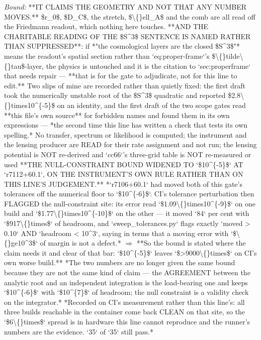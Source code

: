 \begin{description}
 \emph{Bound:}  **IT CLAIMS THE GEOMETRY AND NOT THAT ANY NUMBER MOVES.** \$r\_0\$, \$D\_C\$, the stretch, \$\textbackslash\{\}ell\_A\$ and the comb are all read off the Friedmann readout, which nothing here touches.  **AND THE CHARITABLE READING OF THE \$S\textasciicircum{}3\$ SENTENCE IS NAMED RATHER THAN SUPPRESSED**: if *"the cosmological layers are the closed \$S\textasciicircum{}3\$"* means the readout's spatial section rather than `eq:proper-frame`'s \$\textbackslash\{\}tilde\textbackslash\{\}tau\$-layer, the physics is untouched and it is the citation to `sec:properframe` that needs repair --- **that is for the gate to adjudicate, not for this line to edit.**  Two slips of mine are recorded rather than quietly fixed: the first draft took the numerically unstable root of the \$S\textasciicircum{}3\$ quadratic and reported \$2.8\textbackslash\{\}times10\textasciicircum{}\{-5\}\$ on an identity, and the first draft of the two scope gates read **this file's own source** for forbidden names and found them in its own expressions --- *the second time this line has written a check that tests its own spelling.*  No transfer, spectrum or likelihood is computed; the instrument and the lensing producer are READ for their rate assignment and not run; the lensing potential is NOT re-derived and `cc66`'s three-grid table is NOT re-measured or used  **THE NULL-CONSTRAINT BOUND WIDENED TO `\$10\textasciicircum{}\{-5\}\$` AT `r7112+60.1`, ON THE INSTRUMENT'S OWN RULE RATHER THAN ON THIS LINE'S JUDGEMENT.** *`r7106+60.1` had moved both of this gate's tolerances off the numerical floor to `\$10\textasciicircum{}\{-6\}\$`. CI's tolerance perturbation then FLAGGED the null-constraint site: its error read `\$1.09\textbackslash\{\}times10\textasciicircum{}\{-9\}\$` on one build and `\$1.77\textbackslash\{\}times10\textasciicircum{}\{-10\}\$` on the other --- it moved `84` per cent with `\$917\textbackslash\{\}times\$` of headroom, and `sweep\_tolerances.py` flags exactly `moved > 0.10` AND `headroom < 10\textasciicircum{}3`, saying in terms that a moving error with `\$\textbackslash\{\}ge10\textasciicircum{}3\$` of margin is not a defect.* \ensuremath{\Rightarrow} **So the bound is stated where the claim needs it and clear of that bar: `\$10\textasciicircum{}\{-5\}\$` leaves `\$>9000\textbackslash\{\}times\$` on CI's own worse build.** *The two numbers are no longer given the same bound because they are not the same kind of claim --- the AGREEMENT between the analytic root and an independent integration is the load-bearing one and keeps `\$10\textasciicircum{}\{-6\}\$` with `\$10\textasciicircum{}\{7\}\$` of headroom; the null constraint is a validity check on the integrator.*  *Recorded on CI's measurement rather than this line's: all three builds reachable in the container come back CLEAN on that site, so the `\$6\textbackslash\{\}times\$` spread is in hardware this line cannot reproduce and the runner's numbers are the evidence. `35` of `35` still pass.*

\end{description}
